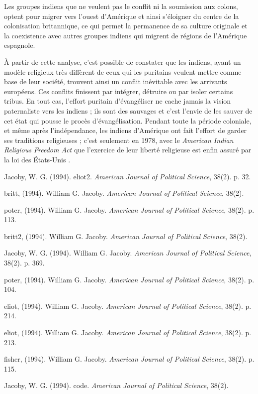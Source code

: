 \documentclass[12pt]{article}
\begin{document}
Les groupes indiens que ne veulent pas le conflit ni la soumission aux colons, optent pour migrer vers l'ouest d'Amérique et ainsi s'éloigner du centre de la colonisation britannique, ce qui permet la permanence de sa culture originale et la coexistence avec autres groupes indiens qui migrent de régions de l'Amérique espagnole.

À partir de cette analyse, c'est possible de constater que les indiens, ayant un modèle religieux très diffèrent de ceux qui les puritains veulent mettre comme base de leur société, trouvent ainsi un conflit inévitable avec les arrivants européens. Ces conflits finissent par intégrer, détruire ou par isoler certains tribus. En tout cas, l'effort puritain d'évangéliser ne cache jamais la vision paternaliste vers les indiens ; ils sont des sauvages et c'est l'envie de les sauver de cet état qui pousse le procès d'évangélisation. Pendant toute la période coloniale, et même après l'indépendance, les indiens d'Amérique ont fait l'effort de garder ses traditions religieuses ; c'est seulement en 1978, avec le \emph{American Indian Religious Freedom Act} que l'exercice de leur liberté religieuse est enfin assuré par la loi des États-Unis \cite{code-10}.

\newpage

\begin{thebibliography}{1}
\raggedright
{}
Jacoby, W. G. (1994). eliot2. \emph{American Journal of Political Science}, 38(2). p. 32. 

britt, (1994). William G. Jacoby. \emph{American Journal of Political Science}, 38(2). 

poter, (1994). William G. Jacoby. \emph{American Journal of Political Science}, 38(2). p. 113. 

britt2, (1994). William G. Jacoby. \emph{American Journal of Political Science}, 38(2). 

Jacoby, W. G. (1994). William G. Jacoby. \emph{American Journal of Political Science}, 38(2). p. 369. 

poter, (1994). William G. Jacoby. \emph{American Journal of Political Science}, 38(2). p. 104. 

eliot, (1994). William G. Jacoby. \emph{American Journal of Political Science}, 38(2). p. 214. 

eliot, (1994). William G. Jacoby. \emph{American Journal of Political Science}, 38(2). p. 213. 

fisher, (1994). William G. Jacoby. \emph{American Journal of Political Science}, 38(2). p. 115. 

Jacoby, W. G. (1994). code. \emph{American Journal of Political Science}, 38(2). 

\end{thebibliography}
\end{document}
